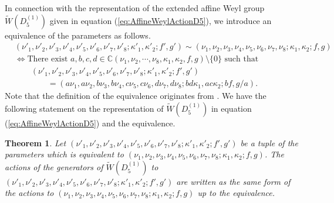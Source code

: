 \documentclass[12pt]{amsart}
\newcommand{\C}{\mathbb {C}}     %
\numberwithin{equation}{section}
\newtheorem{thm}[prop]{\bf Theorem}
\theoremstyle{definition}
\begin{document}
In connection with the representation of the extended affine Weyl group $\widetilde{W}(D^{(1)}_{5})$ given in equation (\ref{eq:AffineWeylActionD5}), we introduce an equivalence of the parameters as follows.
\begin{align}
&  (\nu '_1 , \nu '_2 , \nu '_3 , \nu '_4 ,\nu '_5 ,\nu '_6 , \nu '_7 ,\nu '_8 ; \kappa '_1 ,\kappa '_2 ; f' ,g' ) \sim  (\nu_1 , \nu_2 , \nu_3 , \nu_4 ,\nu_5 ,\nu_6 , \nu_7 ,\nu_8 ;\kappa_1 ,\kappa_2 ; f ,g ) \label{eq:equivD5} \\
& \Leftrightarrow \mbox{There exist } a, b, c, d  \in \C (\nu_1 , \nu_2 , \cdots ,\nu_8 ,\kappa_1 ,\kappa_2 , f ,g ) \setminus \{ 0 \} \mbox{ such that }  \nonumber \\
& \qquad (\nu '_1 , \nu '_2 , \nu '_3 , \nu '_4 ,\nu '_5 ,\nu '_6 , \nu '_7 ,\nu '_8 ; \kappa '_1 ,\kappa '_2 ; f' ,g' )  \nonumber \\
& \qquad \qquad =  (a \nu_1 , a \nu_2 , b \nu_3 , b \nu_4 ,c \nu_5 , c \nu_6 , d \nu_7 , d \nu_8 ; bd \kappa_1 , ac \kappa_2 ; bf ,g/a)  .  \nonumber
\end{align}
Note that the definition of the equivalence originates from \cite[(2.10), (2.12)]{TsqP}.
We have the following statement on the representation of $\widetilde{W}(D^{(1)}_{5})$ in equation (\ref{eq:AffineWeylActionD5}) and the equivalence.
\begin{thm}
Let $(\nu '_1 , \nu '_2 , \nu '_3 , \nu '_4 ,\nu '_5 ,\nu '_6 , \nu '_7 ,\nu '_8 ; \kappa '_1 ,\kappa '_2 ; f' ,g' ) $ be a tuple of the parameters which is equivalent to $ (\nu_1 , \nu_2 , \nu_3 , \nu_4 ,\nu_5 ,\nu_6 , \nu_7 ,\nu_8 ;\kappa_1 ,\kappa_2 ; f ,g )$.
The actions of the generators of  $\widetilde{W}(D^{(1)}_{5})$ to $(\nu '_1 , \nu '_2 , \nu '_3 , \nu '_4 ,\nu '_5 ,\nu '_6 , \nu '_7 ,\nu '_8 ; \kappa '_1 ,\kappa '_2 ; f' ,g' ) $ are written as the same form of the actions to $(\nu _1 , \nu _2 , \nu _3 , \nu _4 ,\nu _5 ,\nu _6 , \nu _7 ,\nu _8 ; \kappa _1 ,\kappa _2 ; f ,g ) $ up to the equivalence.
\end{thm}
\end{document}

